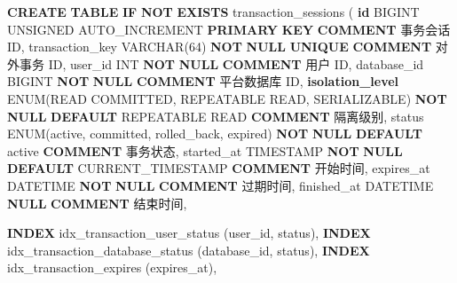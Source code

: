 \documentclass[
  a4paper,
  UTF8]{ctexart}
\newenvironment{Shaded}{}{}
\newcommand{\ControlFlowTok}[1]{\textcolor[rgb]{0.00,0.44,0.13}{\textbf{#1}}}
\newcommand{\DataTypeTok}[1]{\textcolor[rgb]{0.56,0.13,0.00}{#1}}
\newcommand{\DecValTok}[1]{\textcolor[rgb]{0.25,0.63,0.44}{#1}}
\newcommand{\FunctionTok}[1]{\textcolor[rgb]{0.02,0.16,0.49}{#1}}
\newcommand{\KeywordTok}[1]{\textcolor[rgb]{0.00,0.44,0.13}{\textbf{#1}}}
\newcommand{\NormalTok}[1]{#1}
\newcommand{\StringTok}[1]{\textcolor[rgb]{0.25,0.44,0.63}{#1}}
\begin{document}
\begin{Shaded}
\begin{Highlighting}[]
\KeywordTok{CREATE} \KeywordTok{TABLE} \ControlFlowTok{IF} \KeywordTok{NOT} \KeywordTok{EXISTS}\NormalTok{ transaction\_sessions (}
  \KeywordTok{id}\NormalTok{ BIGINT UNSIGNED AUTO\_INCREMENT }\KeywordTok{PRIMARY} \KeywordTok{KEY} \KeywordTok{COMMENT} \StringTok{\textquotesingle{}事务会话 ID\textquotesingle{}}\NormalTok{,}
\NormalTok{  transaction\_key }\DataTypeTok{VARCHAR}\NormalTok{(}\DecValTok{64}\NormalTok{) }\KeywordTok{NOT} \KeywordTok{NULL} \KeywordTok{UNIQUE} \KeywordTok{COMMENT} \StringTok{\textquotesingle{}对外事务 ID\textquotesingle{}}\NormalTok{,}
\NormalTok{  user\_id }\DataTypeTok{INT} \KeywordTok{NOT} \KeywordTok{NULL} \KeywordTok{COMMENT} \StringTok{\textquotesingle{}用户 ID\textquotesingle{}}\NormalTok{,}
\NormalTok{  database\_id BIGINT }\KeywordTok{NOT} \KeywordTok{NULL} \KeywordTok{COMMENT} \StringTok{\textquotesingle{}平台数据库 ID\textquotesingle{}}\NormalTok{,}
  \KeywordTok{isolation\_level}\NormalTok{ ENUM(}\StringTok{\textquotesingle{}READ COMMITTED\textquotesingle{}}\NormalTok{, }\StringTok{\textquotesingle{}REPEATABLE READ\textquotesingle{}}\NormalTok{, }\StringTok{\textquotesingle{}SERIALIZABLE\textquotesingle{}}\NormalTok{) }\KeywordTok{NOT} \KeywordTok{NULL} \KeywordTok{DEFAULT} \StringTok{\textquotesingle{}REPEATABLE READ\textquotesingle{}} \KeywordTok{COMMENT} \StringTok{\textquotesingle{}隔离级别\textquotesingle{}}\NormalTok{,}
\NormalTok{  status ENUM(}\StringTok{\textquotesingle{}active\textquotesingle{}}\NormalTok{, }\StringTok{\textquotesingle{}committed\textquotesingle{}}\NormalTok{, }\StringTok{\textquotesingle{}rolled\_back\textquotesingle{}}\NormalTok{, }\StringTok{\textquotesingle{}expired\textquotesingle{}}\NormalTok{) }\KeywordTok{NOT} \KeywordTok{NULL} \KeywordTok{DEFAULT} \StringTok{\textquotesingle{}active\textquotesingle{}} \KeywordTok{COMMENT} \StringTok{\textquotesingle{}事务状态\textquotesingle{}}\NormalTok{,}
\NormalTok{  started\_at }\DataTypeTok{TIMESTAMP} \KeywordTok{NOT} \KeywordTok{NULL} \KeywordTok{DEFAULT} \FunctionTok{CURRENT\_TIMESTAMP} \KeywordTok{COMMENT} \StringTok{\textquotesingle{}开始时间\textquotesingle{}}\NormalTok{,}
\NormalTok{  expires\_at DATETIME }\KeywordTok{NOT} \KeywordTok{NULL} \KeywordTok{COMMENT} \StringTok{\textquotesingle{}过期时间\textquotesingle{}}\NormalTok{,}
\NormalTok{  finished\_at DATETIME }\KeywordTok{NULL} \KeywordTok{COMMENT} \StringTok{\textquotesingle{}结束时间\textquotesingle{}}\NormalTok{,}

  \KeywordTok{INDEX}\NormalTok{ idx\_transaction\_user\_status (user\_id, status),}
  \KeywordTok{INDEX}\NormalTok{ idx\_transaction\_database\_status (database\_id, status),}
  \KeywordTok{INDEX}\NormalTok{ idx\_transaction\_expires (expires\_at),}


\end{Highlighting}
\end{Shaded}
\end{document}
